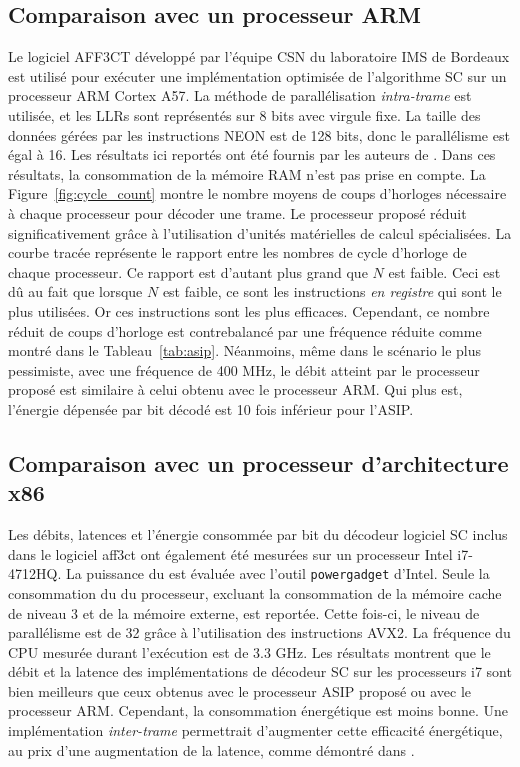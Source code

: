 \subsection{Comparaison avec un processeur ARM}
Le logiciel AFF3CT développé par l'équipe CSN du laboratoire IMS de Bordeaux est utilisé pour exécuter une implémentation optimisée de l'algorithme SC sur un processeur ARM Cortex A57. La méthode de parallélisation \textit{intra-trame} est utilisée, et les LLRs sont représentés sur 8 bits avec virgule fixe. La taille des données gérées par les instructions NEON est de 128 bits, donc le parallélisme est égal à 16. Les résultats ici reportés ont été fournis par les auteurs de \cite{cassagne_energy_2016}. Dans ces résultats, la consommation de la mémoire RAM n'est pas prise en compte.
La Figure~\ref{fig:cycle_count} montre le nombre moyens de coups d'horloges nécessaire à chaque processeur pour décoder une trame. Le processeur proposé réduit significativement grâce à l'utilisation d'unités matérielles de calcul spécialisées. La courbe tracée représente le rapport entre les nombres de cycle d'horloge de chaque processeur. Ce rapport est d'autant plus grand que $N$ est faible. Ceci est dû au fait que lorsque $N$ est faible, ce sont les instructions \textit{en registre} qui sont le plus utilisées. Or ces instructions sont les plus efficaces.
Cependant, ce nombre réduit de coups d'horloge est contrebalancé par une fréquence réduite comme montré dans le Tableau~\ref{tab:asip}. Néanmoins, même dans le scénario le plus pessimiste, avec une fréquence de 400 MHz, le débit atteint par le processeur proposé est similaire à celui obtenu avec le processeur ARM. Qui plus est, l'énergie dépensée par bit décodé est 10 fois inférieur pour l'ASIP.

\subsection{Comparaison avec un processeur d'architecture x86}
Les débits, latences et l'énergie consommée par bit du décodeur logiciel SC inclus dans le logiciel aff3ct ont également été mesurées sur un processeur Intel i7-4712HQ.
La puissance du \coeur est évaluée avec l'outil \texttt{powergadget} d'Intel. Seule la consommation du \coeur du processeur, excluant la consommation de la mémoire cache de niveau 3 et de la mémoire externe, est reportée. Cette fois-ci, le niveau de parallélisme est de 32 grâce à l'utilisation des instructions AVX2. La fréquence du CPU mesurée durant l'exécution est de 3.3 GHz. Les résultats montrent que le débit et la latence des implémentations de décodeur SC sur les processeurs i7 sont bien meilleurs que ceux obtenus avec le processeur ASIP proposé ou avec le processeur ARM. Cependant, la consommation énergétique est moins bonne. Une implémentation \textit{inter-trame} permettrait d'augmenter cette efficacité énergétique, au prix d'une augmentation de la latence, comme démontré dans \cite{cassagne_energy_2016}.


